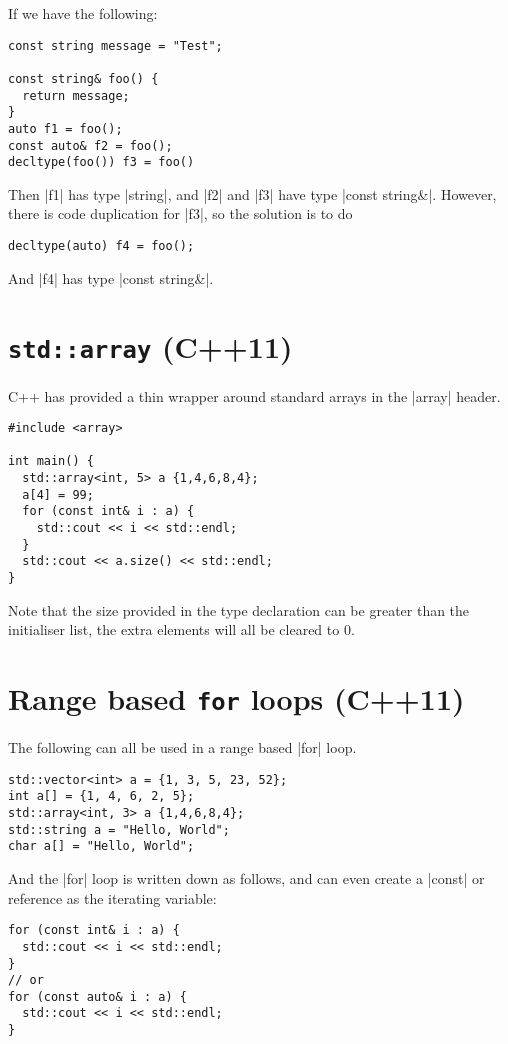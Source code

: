\documentclass[a4paper,12pt,oneside]{book}
\begin{document}
{If we have the following:

\begin{lstlisting}
const string message = "Test";

const string& foo() {
  return message;
}
auto f1 = foo();
const auto& f2 = foo();
decltype(foo()) f3 = foo()
\end{lstlisting}

Then \lst|f1| has type \lst|string|, and \lst|f2| and \lst|f3| have type \lst|const string&|. However, there is code duplication for \lst|f3|, so the solution is to do

\begin{lstlisting}
decltype(auto) f4 = foo();
\end{lstlisting}
And \lst|f4| has type \lst|const string&|.

\section{\texttt{std::array} (C++11)}
C++ has provided a thin wrapper around standard arrays in the \lst|array| header.

\begin{lstlisting}
#include <array>

int main() {
  std::array<int, 5> a {1,4,6,8,4};
  a[4] = 99;
  for (const int& i : a) {
    std::cout << i << std::endl;
  }
  std::cout << a.size() << std::endl;
}
\end{lstlisting}

Note that the size provided in the type declaration can be greater than the initialiser list, the extra elements will all be cleared to 0.

\section{Range based \texttt{for} loops (C++11)}
The following can all be used in a range based \lst|for| loop.
\begin{lstlisting}
std::vector<int> a = {1, 3, 5, 23, 52};
int a[] = {1, 4, 6, 2, 5};
std::array<int, 3> a {1,4,6,8,4};
std::string a = "Hello, World";
char a[] = "Hello, World";
\end{lstlisting}
And the \lst|for| loop is written down as follows, and can even create a \lst|const| or reference as the iterating variable:
\begin{lstlisting}
for (const int& i : a) {
  std::cout << i << std::endl;
}
// or
for (const auto& i : a) {
  std::cout << i << std::endl;
}
\end{lstlisting}
}
\end{document}
